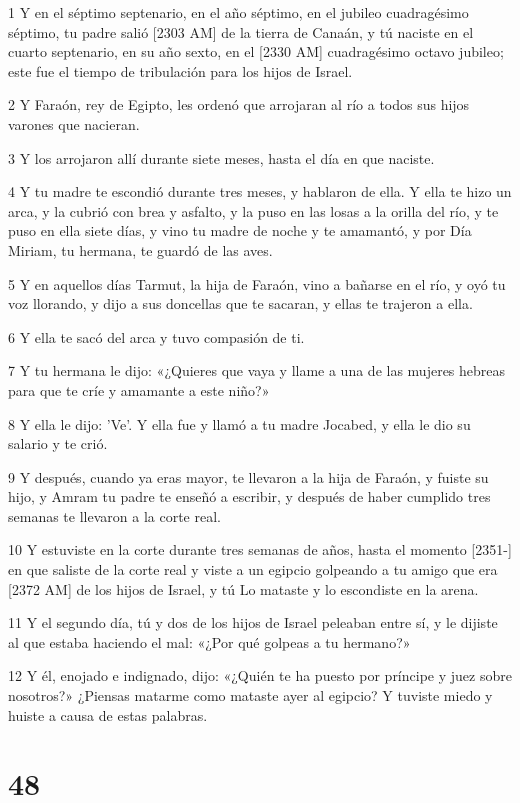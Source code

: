 \par 1 Y en el séptimo septenario, en el año séptimo, en el jubileo cuadragésimo séptimo, tu padre salió [2303 AM] de la tierra de Canaán, y tú naciste en el cuarto septenario, en su año sexto, en el [2330 AM] cuadragésimo octavo jubileo; este fue el tiempo de tribulación para los hijos de Israel.
\par 2 Y Faraón, rey de Egipto, les ordenó que arrojaran al río a todos sus hijos varones que nacieran.
\par 3 Y los arrojaron allí durante siete meses, hasta el día en que naciste.
\par 4 Y tu madre te escondió durante tres meses, y hablaron de ella. Y ella te hizo un arca, y la cubrió con brea y asfalto, y la puso en las losas a la orilla del río, y te puso en ella siete días, y vino tu madre de noche y te amamantó, y por Día Miriam, tu hermana, te guardó de las aves.
\par 5 Y en aquellos días Tarmut, la hija de Faraón, vino a bañarse en el río, y oyó tu voz llorando, y dijo a sus doncellas que te sacaran, y ellas te trajeron a ella.
\par 6 Y ella te sacó del arca y tuvo compasión de ti.
\par 7 Y tu hermana le dijo: «¿Quieres que vaya y llame a una de las mujeres hebreas para que te críe y amamante a este niño?»
\par 8 Y ella le dijo: 'Ve'. Y ella fue y llamó a tu madre Jocabed, y ella le dio su salario y te crió.
\par 9 Y después, cuando ya eras mayor, te llevaron a la hija de Faraón, y fuiste su hijo, y Amram tu padre te enseñó a escribir, y después de haber cumplido tres semanas te llevaron a la corte real.
\par 10 Y estuviste en la corte durante tres semanas de años, hasta el momento [2351-] en que saliste de la corte real y viste a un egipcio golpeando a tu amigo que era [2372 AM] de los hijos de Israel, y tú Lo mataste y lo escondiste en la arena.
\par 11 Y el segundo día, tú y dos de los hijos de Israel peleaban entre sí, y le dijiste al que estaba haciendo el mal: «¿Por qué golpeas a tu hermano?»
\par 12 Y él, enojado e indignado, dijo: «¿Quién te ha puesto por príncipe y juez sobre nosotros?» ¿Piensas matarme como mataste ayer al egipcio? Y tuviste miedo y huiste a causa de estas palabras.

\chapter{48}

